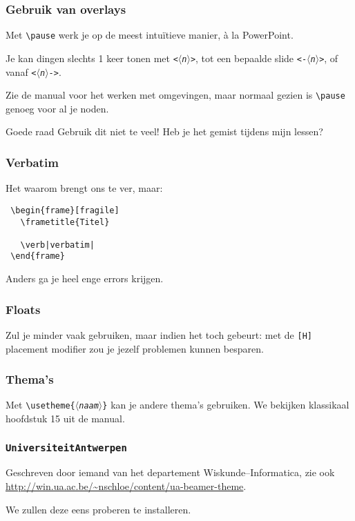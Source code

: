 \begin{frame}[fragile]
  \frametitle{Gebruik van overlays}

  Met \verb|\pause| werk je op de meest intu\"itieve manier, \`a la PowerPoint.

  Je kan dingen slechts 1 keer tonen met \texttt{<$\langle$\textsl{n}$\rangle$>}, tot een bepaalde slide \texttt{<-$\langle$\textsl{n}$\rangle$>}, of vanaf \texttt{<$\langle$\textsl{n}$\rangle$->}.

  Zie de manual voor het werken met omgevingen, maar normaal gezien is \verb|\pause| genoeg voor al je noden.

  \begin{alertblock}{Goede raad}
    Gebruik dit niet te veel! Heb je het gemist tijdens mijn lessen?
  \end{alertblock}
\end{frame}

\begin{frame}[fragile]
  \frametitle{Verbatim}

  Het waarom brengt ons te ver, maar:
  \begin{verbatim}
 \begin{frame}[fragile]
   \frametitle{Titel}

   \verb|verbatim|
 \end{frame}
  \end{verbatim}

  Anders ga je heel enge errors krijgen.
\end{frame}

\begin{frame}[fragile]
  \frametitle{Floats}

  Zul je minder vaak gebruiken, maar indien het toch gebeurt: met de \verb|[H]| placement modifier zou je jezelf problemen kunnen besparen.
\end{frame}

\begin{frame}
  \frametitle{Thema's}

  Met \texttt{\textbackslash usetheme\{$\langle$\textsl{naam}$\rangle$\}} kan je andere thema's gebruiken. We bekijken klassikaal hoofdstuk 15 uit de manual.
\end{frame}

\begin{frame}
  \frametitle{\texttt{UniversiteitAntwerpen}}

  Geschreven door iemand van het departement Wiskunde--Informatica, zie ook \url{http://win.ua.ac.be/~nschloe/content/ua-beamer-theme}.

  We zullen deze eens proberen te installeren.
\end{frame}
